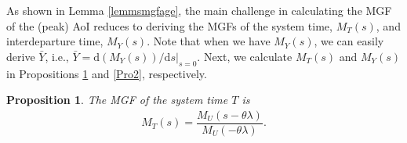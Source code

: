 \documentclass[conference]{IEEEtran}
\newtheorem{Pro}{Proposition}
\newcommand{\RY}[1]{{\color{red} RY: #1}}
\begin{document}
As shown in Lemma \ref{lemmsmgfage}, the main challenge in calculating the MGF  of the (peak) AoI reduces to deriving the  MGFs of the system time, $M_{T}(s)$, and interdeparture time, $M_{Y}(s)$. Note that when we have $M_{Y}(s)$, we can easily derive $\bar{Y}$, i.e., $
\bar{Y}=\mathrm{d}(M_{Y}(s))/{\mathrm{d}s}|_{s=0}
$.
Next, we calculate $M_{T}(s)$ and $M_{Y}(s)$ in Propositions \ref{Pro1} and \ref{Pro2}, respectively. 
\begin{Pro}\label{Pro1}
The MGF of the system time $T$
is 
\begin{align}\label{mgfsystemtime}
M_{T}(s)=\dfrac{M_U(s-\theta\lambda)}{M_{U}(-\theta\lambda)}.
 \end{align}
\end{Pro}
\end{document}
